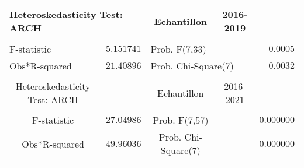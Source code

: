 \begin{tabular}{lrrrr}
\multicolumn{2}{l}{Heteroskedasticity Test: ARCH}&\multicolumn{1}{c}{Echantillon}&\multicolumn{1}{c}{2016-2019}&\multicolumn{1}{c}{}\\
[4.5pt] \hline \\ [-4.5pt]
\multicolumn{1}{l}{F-statistic}&\multicolumn{1}{r}{$5.151741$}&\multicolumn{2}{l}{Prob. F(7,33)}&\multicolumn{1}{r}{$0.0005$}\\
\multicolumn{1}{l}{Obs*R-squared}&\multicolumn{1}{r}{$21.40896$}&\multicolumn{2}{l}{Prob. Chi-Square(7)}&\multicolumn{1}{r}{$0.0032$}\\
[4.5pt] \hline \\ [-4.5pt]
\multicolumn{1}{c}{Heteroskedasticity Test: ARCH}&\multicolumn{1}{c}{}&\multicolumn{1}{c}{Echantillon}&\multicolumn{1}{c}{2016-2021}&\multicolumn{1}{c}{}\\
[4.5pt] \hline \\ [-4.5pt]
\multicolumn{1}{c}{F-statistic}&\multicolumn{1}{c}{$27.04986$}&\multicolumn{1}{c}{Prob. F(7,57)}&\multicolumn{1}{c}{}&\multicolumn{1}{c}{$0.000000$}\\
\multicolumn{1}{c}{Obs*R-squared}&\multicolumn{1}{c}{$49.96036$}&\multicolumn{1}{c}{Prob. Chi-Square(7)}&\multicolumn{1}{c}{}&\multicolumn{1}{c}{$0.000000$}\\
[4.5pt] \hline \\ [-4.5pt]
\end{tabular}
